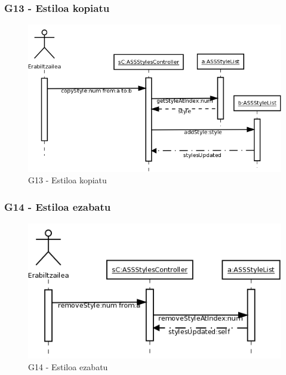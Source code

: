 \subsubsection{G13 - Estiloa kopiatu}
\begin{figure}[htp]
\begin{center}
\includegraphics[scale=0.35]{Pictures/Chapter4/Diseinua/G13.png}
\caption{G13 - Estiloa kopiatu}
\label{g13d}
\end{center}
\end{figure}

\newpage
\subsubsection{G14 - Estiloa ezabatu}
\begin{figure}[htp]
\begin{center}
\includegraphics[scale=0.35]{Pictures/Chapter4/Diseinua/G14.png}
\caption{G14 - Estiloa ezabatu}
\label{g14d}
\end{center}
\end{figure}


